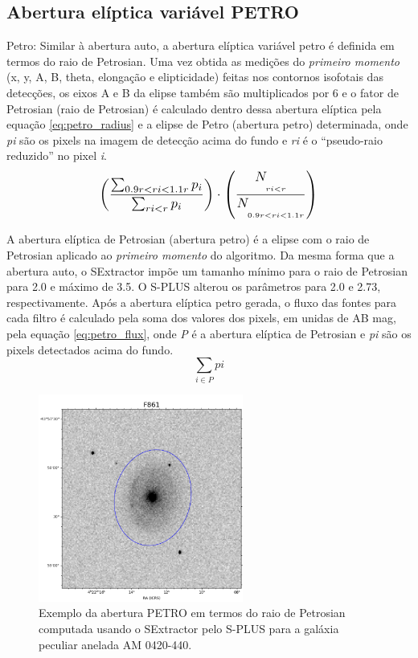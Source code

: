 \subsection{Abertura elíptica variável PETRO}
Petro: Similar à abertura auto, a abertura elíptica variável petro é definida em termos do raio de Petrosian\cite{1976ApJ...209L...1P}. Uma vez obtida as medições do \emph{primeiro momento} (x, y, A, B, theta, elongação e elipticidade) feitas nos contornos isofotais das detecções, os eixos A e B da elipse também são multiplicados por 6 e o fator de Petrosian (raio de Petrosian) é calculado dentro dessa abertura elíptica pela equação \ref{eq:petro_radius} e a elipse de Petro (abertura petro) determinada, onde \emph{pi} são os pixels na imagem de detecção acima do fundo e \emph{ri} é o ``pseudo-raio reduzido'' no pixel \emph{i}.
\begin{equation} \label{eq:petro_radius}
\scalebox{1.2}{$\displaystyle \left(\frac{\sum_{0.9r<ri<1.1r} p_i}{\sum_{ri<r} p_i}\right) \cdot \left(\frac{N_{\underset{ri<r}{\ }}}{N_{\underset{0.9r<ri<1.1r}{\ }}}\right)$}
\end{equation}

A abertura elíptica de Petrosian (abertura petro) é a elipse com o raio de Petrosian aplicado ao \emph{primeiro momento} do algoritmo. Da mesma forma que a abertura auto, o SExtractor impõe um tamanho mínimo para o raio de Petrosian para 2.0 e máximo de 3.5. O S-PLUS alterou os parâmetros para 2.0 e 2.73, respectivamente. Após a abertura elíptica petro gerada, o fluxo das fontes para cada filtro é calculado pela soma dos valores dos pixels, em unidas de AB mag, pela equação \ref{eq:petro_flux}, onde \emph{P} é a abertura elíptica de Petrosian e \emph{pi} são os pixels detectados acima do fundo. 
\begin{equation} \label{eq:petro_flux}
\displaystyle
\sum_{i \in P} pi
\end{equation}

\begin{figure}[h]
  \centering 
  \includegraphics[width=0.6\textwidth]{Imagens/petro_exemplo.PNG} 
  \caption[Exemplo da abertura PETRO para a galáxia AM 0420-440.]{Exemplo da abertura PETRO em termos do raio de Petrosian computada usando o SExtractor pelo S-PLUS para a galáxia peculiar anelada AM 0420-440.}
  \label{fig:petro_exemplo} 
\end{figure}

